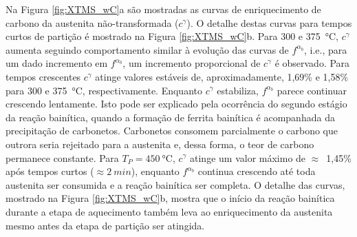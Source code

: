Na Figura \ref{fig:XTMS_wC}a são mostradas as curvas de enriquecimento de carbono da austenita não-transformada ($c^\gamma$). O detalhe destas curvas para tempos curtos de partição é mostrado na Figura \ref{fig:XTMS_wC}b.
Para 300 e \SI{375}{\degreeCelsius}, $c^\gamma$ aumenta seguindo comportamento similar à evolução das curvas de $f^{\alpha_b}$, i.e., para um dado incremento em $f^{\alpha_b}$, um incremento proporcional de $c^\gamma$ é observado. Para tempos crescentes $c^\gamma$ atinge valores estáveis de, aproximadamente, 1,69\% e 1,58\% para 300 e \SI{375}{\degreeCelsius}, respectivamente. Enquanto $c^\gamma$ estabiliza, $f^{\alpha_b}$ parece continuar crescendo lentamente. Isto pode ser explicado pela ocorrência do segundo estágio da reação bainítica, quando a formação de ferrita bainítica é acompanhada da precipitação de carbonetos. Carbonetos consomem parcialmente o carbono que outrora seria rejeitado para a austenita e, dessa forma, o teor de carbono permanece constante. Para $T_P = \SI{450}{\degreeCelsius}$, $c^\gamma$ atinge um valor máximo de $\approx$~1,45\% após tempos curtos ($\approx \SI{2}{min}$), enquanto $f^{\alpha_b}$ continua crescendo até toda austenita ser consumida e a reação bainítica ser completa. O detalhe das curvas, mostrado na Figura \ref{fig:XTMS_wC}b, mostra que o início da reação bainítica durante a etapa de aquecimento também leva ao enriquecimento da austenita mesmo antes da etapa de partição ser atingida.

